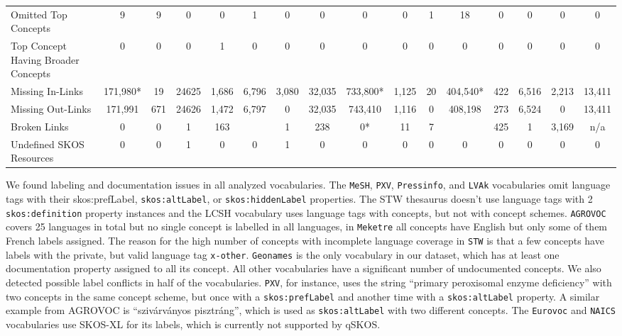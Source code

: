 \begin{table}[h]
\begin{center}
{\begin{tabular}{p{4cm}ccccccccccccccc}
Omitted Top Concepts & 9 & 9 & 0 & 0 & 1 & 0 & 0 & 0 & 0 & 1 & 18 & 0 & 0 & 0 & 0 \\

Top Concept Having Broader Concepts & 0 & 0 & 0 & 1 & 0 &0 & 0 & 0 & 0 & 0 & 0 & 0 & 0 & 0 & 0 \\

\midrule

Missing In-Links & 171,980* & 19 & 24625 & 1,686 & 6,796 & 3,080 & 32,035 & 733,800* & 1,125 & 20 & 404,540* & 422 & 6,516 & 2,213 & 13,411 \\

Missing Out-Links & 171,991 & 671 & 24626 & 1,472 & 6,797 & 0 & 32,035 & 743,410 & 1,116 & 0 & 408,198 & 273 & 6,524 & 0 & 13,411 \\

Broken Links & 0 & 0 & 1 & 163 && 1 & 238 & 0* & 11 & 7 && 425 & 1 & 3,169 & n/a \\


Undefined SKOS Resources & 0 & 0 & 1 & 0 & 0 & 1 & 0 & 0 & 0 & 0 & 0 & 0 & 0 & 0 & 0  \\

\bottomrule
\end{tabular}
}
\end{center}
\end{table}

We found labeling and documentation issues in all analyzed vocabularies. 
The \texttt{MeSH}, \texttt{PXV}, \texttt{Pressinfo}, and \texttt{LVAk} vocabularies omit language tags with their skos:prefLabel, \texttt{skos:altLabel}, or \texttt{skos:hiddenLabel} properties. The STW thesaurus doesn't use language tags with 2 \texttt{skos:definition} property instances and the LCSH vocabulary uses language tags with concepts, but not with concept schemes.
\texttt{AGROVOC} covers 25 languages in total but no single concept is labelled in all languages, in \texttt{Meketre} all concepts have English but only some of them French labels assigned. The reason for the high number of concepts with incomplete language coverage in \texttt{STW} is that a few concepts have labels with the private, but valid language tag \texttt{x-other}. 
\texttt{Geonames} is the only vocabulary in our dataset, which has at least one documentation property assigned to all its concept. All other vocabularies have a significant number of undocumented concepts.
We also detected possible label conflicts in half of the vocabularies. \texttt{PXV}, for instance, uses the string ``primary peroxisomal enzyme deficiency'' with two concepts in the same concept scheme, but once with a \texttt{skos:prefLabel} and another time with a \texttt{skos:altLabel} property. A similar example from AGROVOC is ``sziv\'{a}rv\'{a}nyos pisztr\'{a}ng'', which is used as \texttt{skos:altLabel} with two different concepts.
The \texttt{Eurovoc} and \texttt{NAICS} vocabularies use SKOS-XL for its labels, which is currently not supported by qSKOS.



